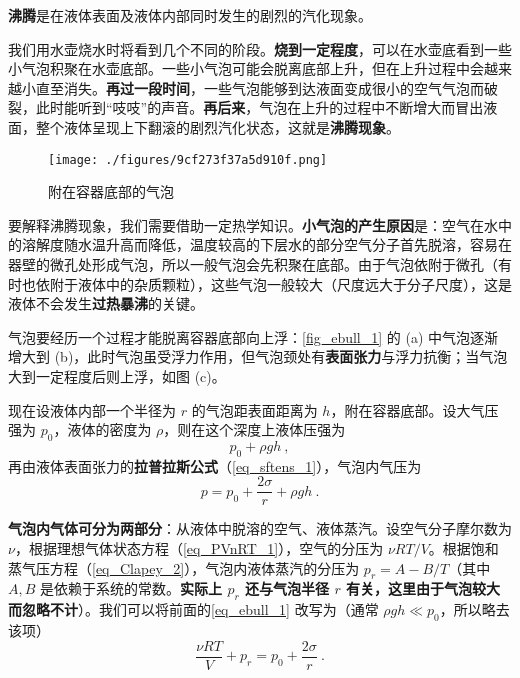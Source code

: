 
\textbf{沸腾}是在液体表面及液体内部同时发生的剧烈的汽化现象。

我们用水壶烧水时将看到几个不同的阶段。\textbf{烧到一定程度}，可以在水壶底看到一些小气泡积聚在水壶底部。一些小气泡可能会脱离底部上升，但在上升过程中会越来越小直至消失。\textbf{再过一段时间}，一些气泡能够到达液面变成很小的空气气泡而破裂，此时能听到“吱吱”的声音。\textbf{再后来}，气泡在上升的过程中不断增大而冒出液面，整个液体呈现上下翻滚的剧烈汽化状态，这就是\textbf{沸腾现象}。
\begin{figure}[ht]
\centering
\texttt{[image: ./figures/9cf273f37a5d910f.png]}
\caption{附在容器底部的气泡} \label{fig_ebull_1}
\end{figure}
要解释沸腾现象，我们需要借助一定热学知识。\textbf{小气泡的产生原因}是：空气在水中的溶解度随水温升高而降低，温度较高的下层水的部分空气分子首先脱溶，容易在器壁的微孔处形成气泡，所以一般气泡会先积聚在底部。由于气泡依附于微孔（有时也依附于液体中的杂质颗粒），这些气泡一般较大（尺度远大于分子尺度），这是液体不会发生\textbf{过热暴沸}的关键。

气泡要经历一个过程才能脱离容器底部向上浮：\autoref{fig_ebull_1} 的 (a) 中气泡逐渐增大到 (b)，此时气泡虽受浮力作用，但气泡颈处有\textbf{表面张力}与浮力抗衡；当气泡大到一定程度后则上浮，如图 (c)。

现在设液体内部一个半径为 $r$ 的气泡距表面距离为 $h$，附在容器底部。设大气压强为 $p_0$，液体的密度为 $\rho$，则在这个深度上液体压强为
\begin{equation}
p_0+\rho gh ~,
\end{equation}
再由液体表面张力的\textbf{拉普拉斯公式}（\autoref{eq_sftens_1}），气泡内气压为
\begin{equation}\label{eq_ebull_1}
p=p_0+\frac{2\sigma}{r}+\rho gh~.
\end{equation}

\textbf{气泡内气体可分为两部分}：从液体中脱溶的空气、液体蒸汽。设空气分子摩尔数为 $\nu$，根据理想气体状态方程（\autoref{eq_PVnRT_1}），空气的分压为 $\nu RT/V$。根据饱和蒸气压方程（\autoref{eq_Clapey_2}），气泡内液体蒸汽的分压为 $p_r=A-B/T$（其中 $A,B$ 是依赖于系统的常数。\textbf{实际上 $p_r$ 还与气泡半径 $r$ 有关，这里由于气泡较大而忽略不计}）。我们可以将前面的\autoref{eq_ebull_1} 改写为（通常 $\rho gh\ll p_0$，所以略去该项）
\begin{equation}\label{eq_ebull_2}
\frac{\nu RT}{V}+p_r=p_0+\frac{2\sigma}{r}~.
\end{equation}

